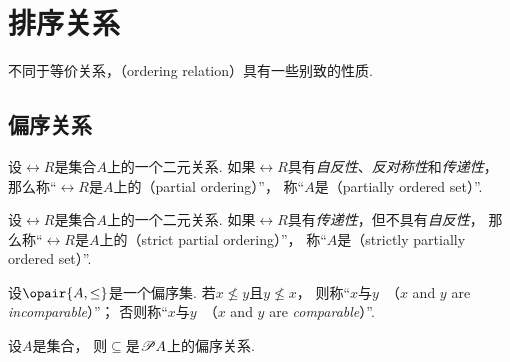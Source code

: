 \section{排序关系}
不同于等价关系，（ordering relation）具有一些别致的性质.

\subsection{偏序关系}
\begin{definition}
设\(\rel{R}\)是集合\(A\)上的一个二元关系.
如果\(\rel{R}\)具有\emph{自反性}、\emph{反对称性}和\emph{传递性}，
那么称“\(\rel{R}\)是\(A\)上的（partial ordering）”，
称“\(A\)是（partially ordered set）”.
\end{definition}

\begin{definition}
设\(\rel{R}\)是集合\(A\)上的一个二元关系.
如果\(\rel{R}\)具有\emph{传递性}，但不具有\emph{自反性}，
那么称“\(\rel{R}\)是\(A\)上的（strict partial ordering）”，
称“\(A\)是（strictly partially ordered set）”.
\end{definition}

\begin{definition}
设\(\opair{A,\leq}\)是一个偏序集.
若\(x \nleq y\)且\(y \nleq x\)，
则称“\(x\)与\(y\)~（\(x\) and \(y\) are \emph{incomparable}）”；
否则称“\(x\)与\(y\)~（\(x\) and \(y\) are \emph{comparable}）”.
\end{definition}

\begin{example}
设\(A\)是集合，
则\(\subseteq\)是\(\mathscr{P} A\)上的偏序关系.
\end{example}

